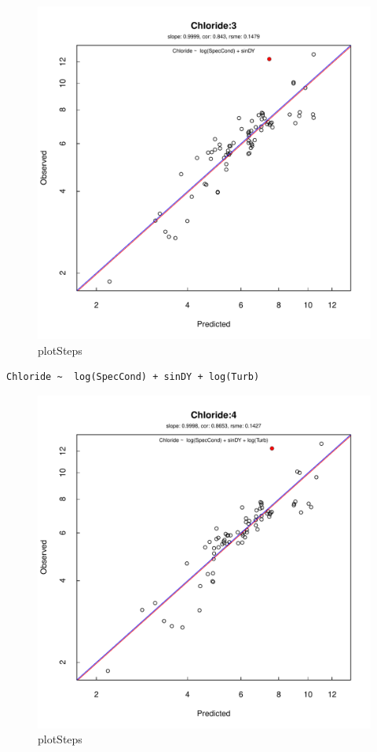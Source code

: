 \documentclass[a4paper,11pt]{article}\usepackage[]{graphicx}\usepackage[]{color}
\makeatletter
\def\maxwidth{ %
  \ifdim\Gin@nat@width>\linewidth
    \linewidth
  \else
    \Gin@nat@width
  \fi
}
\newenvironment{kframe}{%
 \def\at@end@of@kframe{}%
 \ifinner\ifhmode%
  \def\at@end@of@kframe{\end{minipage}}%
  \begin{minipage}{\columnwidth}%
 \fi\fi%
 \def\FrameCommand##1{\hskip\@totalleftmargin \hskip-\fboxsep
 \colorbox{shadecolor}{##1}\hskip-\fboxsep
     \hskip-\linewidth \hskip-\@totalleftmargin \hskip\columnwidth}%
 \MakeFramed {\advance\hsize-\width
   \@totalleftmargin\z@ \linewidth\hsize
   \@setminipage}}%
 {\par\unskip\endMakeFramed%
 \at@end@of@kframe}
\newenvironment{knitrout}{}{} %
\makeatother
\begin{document}
\begin{knitrout}
\begin{figure}[]
\includegraphics[width=\maxwidth]{figure/plotSteps2} \caption[plotSteps]{plotSteps\label{fig:plotSteps2}}
\end{figure}

\begin{kframe}\begin{verbatim}
Chloride ~  log(SpecCond) + sinDY + log(Turb) 
\end{verbatim}
\end{kframe}\begin{figure}[]

\includegraphics[width=\maxwidth]{figure/plotSteps3} \caption[plotSteps]{plotSteps\label{fig:plotSteps3}}
\end{figure}


\end{knitrout}
\end{document}
